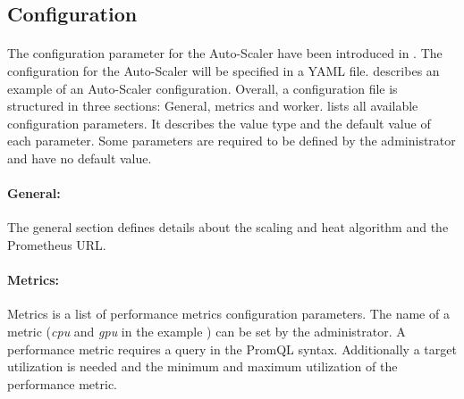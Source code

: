%
%

%
%


\subsection{Configuration}
\paragraph{}The configuration parameter for the Auto-Scaler have been introduced in .
The configuration for the Auto-Scaler will be specified in a YAML file.
 describes an example of an Auto-Scaler configuration.
Overall, a configuration file is structured in three sections: General, metrics and worker.
 lists all available configuration parameters. It describes the value type and the default value of each parameter. Some parameters are required to be defined by the administrator and have no default value.

\paragraph{General:}
The general section defines details about the scaling and heat algorithm and the Prometheus URL.


\paragraph{Metrics:}
Metrics is a list of performance metrics configuration parameters. The name of a metric (\textit{cpu} and \textit{gpu} in the example ) can be set by the administrator. A performance metric requires a query in the PromQL syntax. Additionally a target utilization is needed and the minimum and maximum utilization of the performance metric.


